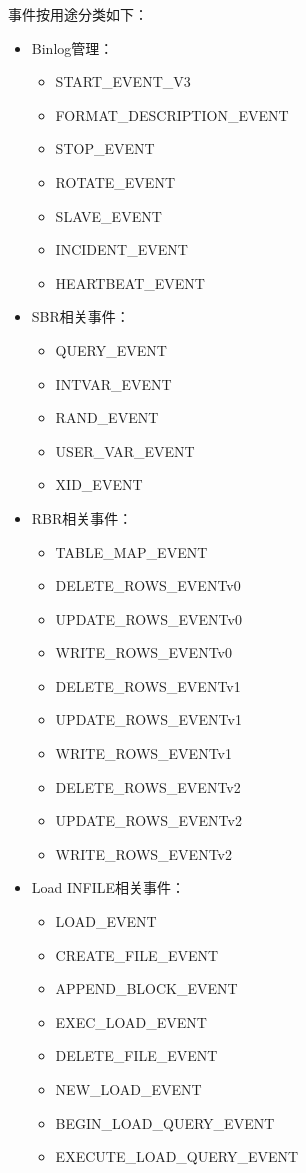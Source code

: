 \documentclass[a4paper, titlepage, 10pt, bookmark]{article}
\begin{document}
事件按用途分类如下：
\begin{itemize}
    \item Binlog管理：
        \begin{itemize}
            \item START\_EVENT\_V3
            \item FORMAT\_DESCRIPTION\_EVENT
            \item STOP\_EVENT
            \item ROTATE\_EVENT
            \item SLAVE\_EVENT
            \item INCIDENT\_EVENT
            \item HEARTBEAT\_EVENT
        \end{itemize}
    \item SBR相关事件：
        \begin{itemize}
            \item QUERY\_EVENT
            \item INTVAR\_EVENT
            \item RAND\_EVENT
            \item USER\_VAR\_EVENT
            \item XID\_EVENT
        \end{itemize}
    \item RBR相关事件：
        \begin{itemize}
            \item TABLE\_MAP\_EVENT
            \item DELETE\_ROWS\_EVENTv0
            \item UPDATE\_ROWS\_EVENTv0
            \item WRITE\_ROWS\_EVENTv0
            \item DELETE\_ROWS\_EVENTv1
            \item UPDATE\_ROWS\_EVENTv1
            \item WRITE\_ROWS\_EVENTv1
            \item DELETE\_ROWS\_EVENTv2
            \item UPDATE\_ROWS\_EVENTv2
            \item WRITE\_ROWS\_EVENTv2
        \end{itemize}
    \item Load INFILE相关事件：
        \begin{itemize}
            \item LOAD\_EVENT
            \item CREATE\_FILE\_EVENT
            \item APPEND\_BLOCK\_EVENT
            \item EXEC\_LOAD\_EVENT
            \item DELETE\_FILE\_EVENT
            \item NEW\_LOAD\_EVENT
            \item BEGIN\_LOAD\_QUERY\_EVENT
            \item EXECUTE\_LOAD\_QUERY\_EVENT
        \end{itemize}
\end{itemize}
\end{document}
